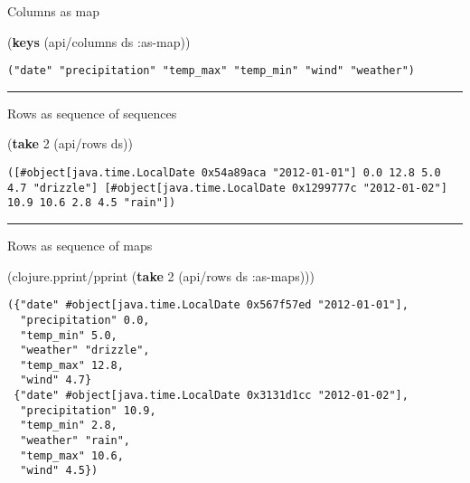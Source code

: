\documentclass[]{article}
\newenvironment{Shaded}{\begin{snugshade}}{\end{snugshade}}
\newcommand{\AttributeTok}[1]{\textcolor[rgb]{0.77,0.63,0.00}{#1}}
\newcommand{\DecValTok}[1]{\textcolor[rgb]{0.00,0.00,0.81}{#1}}
\newcommand{\KeywordTok}[1]{\textcolor[rgb]{0.13,0.29,0.53}{\textbf{#1}}}
\newcommand{\NormalTok}[1]{#1}
\begin{document}
Columns as map

\begin{Shaded}
\begin{Highlighting}[]
\NormalTok{(}\KeywordTok{keys}\NormalTok{ (api/columns ds }\AttributeTok{:as-map}\NormalTok{))}
\end{Highlighting}
\end{Shaded}

\begin{verbatim}
("date" "precipitation" "temp_max" "temp_min" "wind" "weather")
\end{verbatim}

\begin{center}\rule{0.5\linewidth}{0.5pt}\end{center}

Rows as sequence of sequences

\begin{Shaded}
\begin{Highlighting}[]
\NormalTok{(}\KeywordTok{take} \DecValTok{2}\NormalTok{ (api/rows ds))}
\end{Highlighting}
\end{Shaded}

\begin{verbatim}
([#object[java.time.LocalDate 0x54a89aca "2012-01-01"] 0.0 12.8 5.0 4.7 "drizzle"] [#object[java.time.LocalDate 0x1299777c "2012-01-02"] 10.9 10.6 2.8 4.5 "rain"])
\end{verbatim}

\begin{center}\rule{0.5\linewidth}{0.5pt}\end{center}

Rows as sequence of maps

\begin{Shaded}
\begin{Highlighting}[]
\NormalTok{(clojure.pprint/pprint (}\KeywordTok{take} \DecValTok{2}\NormalTok{ (api/rows ds }\AttributeTok{:as-maps}\NormalTok{)))}
\end{Highlighting}
\end{Shaded}

\begin{verbatim}
({"date" #object[java.time.LocalDate 0x567f57ed "2012-01-01"],
  "precipitation" 0.0,
  "temp_min" 5.0,
  "weather" "drizzle",
  "temp_max" 12.8,
  "wind" 4.7}
 {"date" #object[java.time.LocalDate 0x3131d1cc "2012-01-02"],
  "precipitation" 10.9,
  "temp_min" 2.8,
  "weather" "rain",
  "temp_max" 10.6,
  "wind" 4.5})
\end{verbatim}
\end{document}
